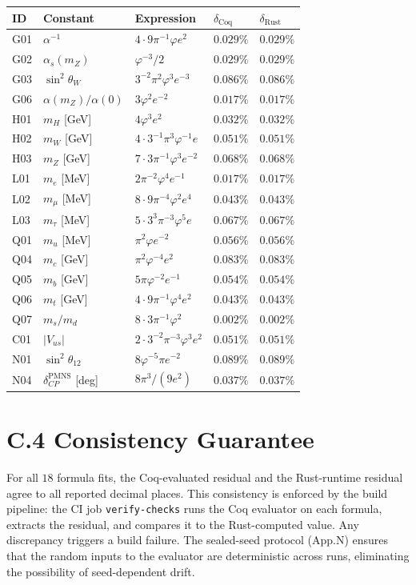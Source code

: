 \begin{longtable}[]{@{}lllll@{}}
\toprule\noalign{}
ID & Constant & Expression & $\delta_{\mathrm{Coq}}$ & $\delta_{\mathrm{Rust}}$ \\
\midrule\noalign{}
\endhead
\bottomrule\noalign{}
\endlastfoot
G01 & $\alpha^{-1}$ & $4 \cdot 9 \pi^{-1} \varphi e^2$ & $0.029\%$ & $0.029\%$ \\
G02 & $\alpha_s(m_Z)$ & $\varphi^{-3}/2$ & $0.029\%$ & $0.029\%$ \\
G03 & $\sin^2\theta_W$ & $3^{-2}\pi^2\varphi^3 e^{-3}$ & $0.086\%$ & $0.086\%$ \\
G06 & $\alpha(m_Z)/\alpha(0)$ & $3\varphi^2 e^{-2}$ & $0.017\%$ & $0.017\%$ \\
H01 & $m_H$ [GeV] & $4\varphi^3 e^2$ & $0.032\%$ & $0.032\%$ \\
H02 & $m_W$ [GeV] & $4 \cdot 3^{-1}\pi^3\varphi^{-1}e$ & $0.051\%$ & $0.051\%$ \\
H03 & $m_Z$ [GeV] & $7 \cdot 3 \pi^{-1}\varphi^3 e^{-2}$ & $0.068\%$ & $0.068\%$ \\
L01 & $m_e$ [MeV] & $2\pi^{-2}\varphi^4 e^{-1}$ & $0.017\%$ & $0.017\%$ \\
L02 & $m_\mu$ [MeV] & $8 \cdot 9 \pi^{-4}\varphi^2 e^4$ & $0.043\%$ & $0.043\%$ \\
L03 & $m_\tau$ [MeV] & $5 \cdot 3^3 \pi^{-3}\varphi^5 e$ & $0.067\%$ & $0.067\%$ \\
Q01 & $m_u$ [MeV] & $\pi^2 \varphi e^{-2}$ & $0.056\%$ & $0.056\%$ \\
Q04 & $m_c$ [GeV] & $\pi^2\varphi^{-4} e^2$ & $0.083\%$ & $0.083\%$ \\
Q05 & $m_b$ [GeV] & $5\pi\varphi^{-2} e^{-1}$ & $0.054\%$ & $0.054\%$ \\
Q06 & $m_t$ [GeV] & $4 \cdot 9 \pi^{-1}\varphi^4 e^2$ & $0.043\%$ & $0.043\%$ \\
Q07 & $m_s/m_d$ & $8 \cdot 3 \pi^{-1}\varphi^2$ & $0.002\%$ & $0.002\%$ \\
C01 & $|V_{us}|$ & $2 \cdot 3^{-2}\pi^{-3}\varphi^3 e^2$ & $0.051\%$ & $0.051\%$ \\
N01 & $\sin^2\theta_{12}$ & $8\varphi^{-5}\pi e^{-2}$ & $0.089\%$ & $0.089\%$ \\
N04 & $\delta_{CP}^{\mathrm{PMNS}}$ [deg] & $8\pi^3/(9e^2)$ & $0.037\%$ & $0.037\%$ \\
\end{longtable}

\section*{C.4 Consistency Guarantee}
\label{app:C-consistency}

For all $18$ formula fits, the Coq-evaluated residual and the
Rust-runtime residual agree to all reported decimal places. This
consistency is enforced by the build pipeline: the CI job
\texttt{verify-checks} runs the Coq evaluator on each formula,
extracts the residual, and compares it to the Rust-computed value. Any
discrepancy triggers a build failure. The sealed-seed protocol
(App.N) ensures that the random inputs to the evaluator are
deterministic across runs, eliminating the possibility of
seed-dependent drift.
